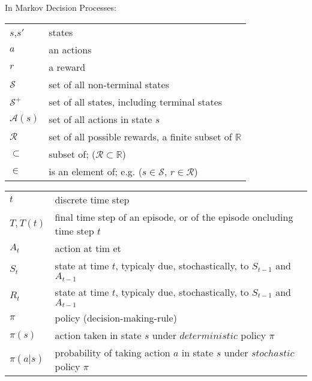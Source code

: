 \documentclass[10pt, landscape, a4paper]{article}
\begin{document}
\begin{multicols}{3}
        In Markov Decision Processes:
        \begin{tabular}{ p{} p{} }
            $s$,$s'$          & states                                                        \\
            $a$               & an actions                                                    \\
            $r$               & a reward                                                      \\
            $\mathcal{S}$     & set of all non-terminal states                                \\
            $\mathcal{S}^{+}$ & set of all states, including terminal states                  \\
            $\mathcal{A}(s)$  & set of all actions in state $s$                               \\
            $\mathcal{R}$     & set of all possible rewards, a finite subset of $\mathbb{R}$  \\
            $\subset$         & subset of; ($\mathcal{R}\subset\mathbb{R}$)                   \\
            $\in$             & is an element of; e.g. ($s\in\mathcal{S}$, $r\in\mathcal{R}$) \\
        \end{tabular}

        \begin{tabular}{ p{} p{} }
            $t$        & discrete time step                                                            \\
            $T, T(t)$  & final time step of an episode, or of the episode oncluding time step $t$      \\
            $A_t$      & action at tim et                                                              \\
            $S_t$      & state at time $t$, typicaly due, stochastically, to $S_{t-1}$ and $A_{t-1}$   \\
            $R_t$      & state at time $t$, typicaly due, stochastically, to $S_{t-1}$ and $A_{t-1}$   \\
            $\pi$      & policy (decision-making-rule)                                                 \\
            $\pi(s)$   & action taken in state $s$ under $deterministic$ policy $\pi$                  \\
            $\pi(a|s)$ & probability of taking action $a$ in state $s$ under $stochastic$ policy $\pi$ \\
        \end{tabular}


\end{multicols}
\end{document}
